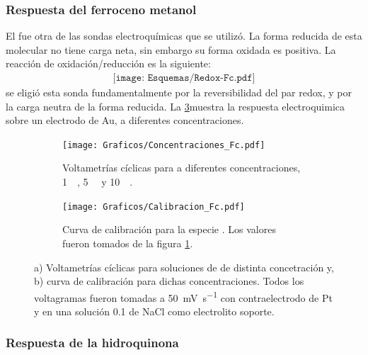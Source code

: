 {		\subsubsection*{Respuesta del ferroceno metanol}
 	 	  El \fc\space fue otra de las sondas electroquímicas que se utilizó. La forma reducida de esta molecular no tiene carga neta, sin embargo su forma oxidada es positiva. La reacción de oxidación/reducción es la siguiente:
 	 				 \begin{equation}
 	 	 				\begin{aligned}
 	 	 				\texttt{[image: Esquemas/Redox-Fc.pdf]}
 	 	 				\end{aligned}
 	 	 			 \end{equation}
 	 	  se eligió esta sonda fundamentalmente por la reversibilidad del par redox, y por la carga neutra de la forma reducida. La \ref{Fig:Fc}muestra la respuesta electroquimica sobre un electrodo de Au, a diferentes concentraciones.
		 		 \begin{figure}[ht]
		 	      \begin{subfigure}[t]{0.495\textwidth}
		          	\texttt{[image: Graficos/Concentraciones\_Fc.pdf]}
		         	\caption{Voltametrías cíclicas para \fc\space a diferentes concentraciones, \SI{1}{\milli\Molar}, \SI{5}{\milli\Molar} y \SI{10}{\milli\Molar}.}
		          	\label{fig:Fc_a}
		      		\end{subfigure}
		      	 \begin{subfigure}[t]{0.495\textwidth}
		          	\texttt{[image: Graficos/Calibracion\_Fc.pdf]}
		         	\caption{Curva de calibración para la especie \fc. Los valores fueron tomados de la figura \ref{fig:Fc_a}.}
		          	\label{fig:Fc_b}
		      		\end{subfigure}
		      	 \caption[Respuesta electroquímica para \fc]{a) Voltametrías cíclicas para soluciones de \fc\space de distinta concetración y, b) curva de calibración para dichas concentraciones. Todos los voltagramas fueron tomadas a \SI{50}{\milli\volt\per\second} con contraelectrodo de Pt y en una solución \SI{0.1}{\Molar} de NaCl como electrolito soporte.}
		      	 \label{Fig:Fc}
	      		 \end{figure}

		\subsubsection*{Respuesta de la hidroquinona}
		 	 
}
